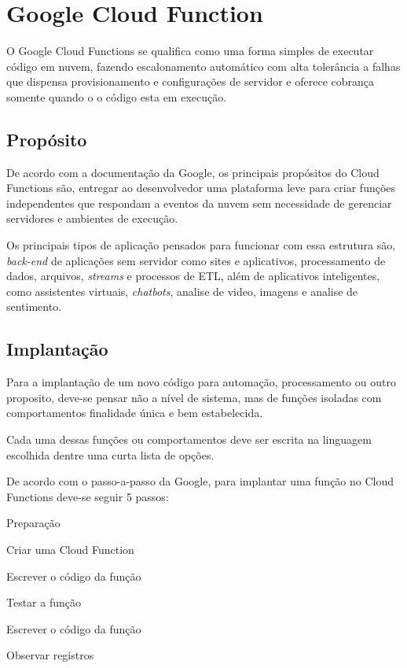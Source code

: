\section{Google Cloud Function}

O Google Cloud Functions se qualifica como uma forma simples de executar código
em nuvem, fazendo escalonamento automático com alta tolerância a falhas que
dispensa provisionamento e configurações de servidor e oferece cobrança somente
quando o o código esta em execução.

\subsection{Propósito}

De acordo com a documentação da Google, os principais propósitos do Cloud
Functions são, entregar ao desenvolvedor uma plataforma leve para criar funções
independentes que respondam a eventos da nuvem sem necessidade de gerenciar
servidores e ambientes de execução.

Os principais tipos de aplicação pensados para funcionar com essa estrutura
são, \textit{back-end} de aplicações sem servidor como sites e aplicativos,
processamento de dados, arquivos, \textit{streams} e processos de ETL, além de
aplicativos inteligentes, como assistentes virtuais, \textit{chatbots}, analise
de video, imagens e analise de sentimento.

\subsection{Implantação}
Para a implantação de um novo código para automação, processamento ou outro
proposito, deve-se pensar não a nível de sistema, mas de funções isoladas com
comportamentos finalidade única e bem estabelecida.

\bigskip
Cada uma dessas funções ou comportamentos deve ser escrita na linguagem
escolhida dentre uma curta lista de opções.

\bigskip
De acordo com o passo-a-passo da Google, para implantar uma função no Cloud
Functions deve-se seguir 5 passos:
\begin{alineas}
	\item Preparação
	\item Criar uma Cloud Function
	\item Escrever o código da função
	\item Testar a função
	\item Escrever o código da função
	\item Observar registros
\end{alineas}

